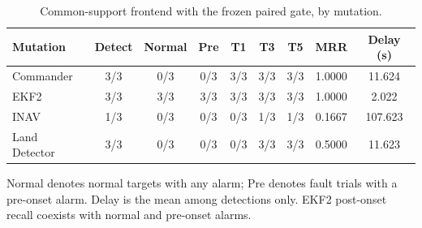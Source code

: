 \begin{table}[htbp]
\centering\footnotesize
\caption{Common-support frontend with the frozen paired gate, by mutation.}
\label{tab:s_mutation}
\renewcommand{\arraystretch}{1.15}
\setlength{\tabcolsep}{4pt}
\begin{tabular}{lcccccccc}
\toprule
Mutation & Detect & Normal & Pre & T1 & T3 & T5 & MRR & Delay (s)\\
\midrule
Commander & 3/3 & 0/3 & 0/3 & 3/3 & 3/3 & 3/3 & 1.0000 & 11.624\\
EKF2 & 3/3 & 3/3 & 3/3 & 3/3 & 3/3 & 3/3 & 1.0000 & 2.022\\
INAV & 1/3 & 0/3 & 0/3 & 0/3 & 1/3 & 1/3 & 0.1667 & 107.623\\
Land Detector & 3/3 & 0/3 & 0/3 & 0/3 & 3/3 & 3/3 & 0.5000 & 11.623\\
\bottomrule
\end{tabular}
\par\smallskip\parbox{0.98\linewidth}{\scriptsize Normal denotes normal targets with any alarm; Pre denotes fault trials with a pre-onset alarm. Delay is the mean among detections only. EKF2 post-onset recall coexists with normal and pre-onset alarms.}
\end{table}

